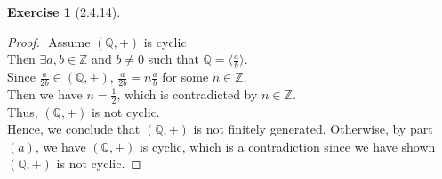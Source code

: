 \documentclass{amsart}
\newcommand{\bbz}{\mathbb{Z}}
\newcommand{\bbq}{\mathbb{Q}}
\theoremstyle{plain}
\theoremstyle{definition}
\newtheorem{exer}[lem]{Exercise}
\begin{document}
\begin{exer}[2.4.14]
\begin{enumerate}[(a)]
	\begin{proof}
	$ $\newline
	Assume $(\bbq,+)$ is cyclic\\
	Then $\exists a,b \in \bbz$ and $b \neq 0$ such that $\bbq = \langle \frac{a}{b}\rangle$. \\
	Since $\frac{a}{2b} \in (\bbq,+)$, $\frac{a}{2b} = n\frac{a}{b}$ for some $n \in \bbz$.\\
	Then we have $n = \frac{1}{2}$, which is contradicted by $n\in \bbz$.\\
	Thus, $(\bbq,+)$ is not cyclic.\\
	Hence, we conclude that $(\bbq,+)$ is not finitely generated. Otherwise, by part $(a)$, we have $(\bbq,+)$ is cyclic, which is a contradiction since we have shown $(\bbq,+)$ is not cyclic.

	\end{proof}
\end{enumerate}
\end{exer}
\end{document}
